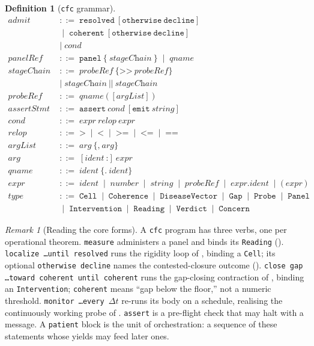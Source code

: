\documentclass[11pt,a4paper]{article}
\theoremstyle{cfcthm}
\theoremstyle{definition}
\newtheorem{definition}[theorem]{Definition}
\theoremstyle{remark}
\newtheorem{remark}[theorem]{Remark}
\newcommand{\bnf}{\;::=\;}
\newcommand{\alt}{\;\mid\;}
\newcommand{\cf}[1]{\texttt{#1}}
\begin{document}
\begin{definition}[\cf{cfc} grammar]
\begin{align*}
\textit{admit} &\bnf \cf{resolved}\ [\cf{otherwise}\ \cf{decline}]\\
  &\alt\cf{coherent}\ [\cf{otherwise}\ \cf{decline}]\\
  &\alt\textit{cond}\\[2pt]
\textit{panelRef} &\bnf \cf{panel}\ \cf{\{}\ \textit{stageChain}\ \cf{\}}\alt\textit{qname}\\
\textit{stageChain} &\bnf \textit{probeRef}\ \{\cf{>>}\ \textit{probeRef}\}\\
  &\alt\textit{stageChain}\ \cf{||}\ \textit{stageChain}\\
\textit{probeRef} &\bnf \textit{qname}\ \cf{(}\ [\textit{argList}]\ \cf{)}\\[2pt]
\textit{assertStmt} &\bnf \cf{assert}\ \textit{cond}\ [\cf{emit}\ \textit{string}]\\[2pt]
\textit{cond} &\bnf \textit{expr}\ \textit{relop}\ \textit{expr}\\
\textit{relop} &\bnf \cf{>}\alt\cf{<}\alt\cf{>=}\alt\cf{<=}\alt\cf{==}\\
\textit{argList} &\bnf \textit{arg}\ \{\cf{,}\ \textit{arg}\}\\
\textit{arg} &\bnf [\textit{ident}\ \cf{:}]\ \textit{expr}\\
\textit{qname} &\bnf \textit{ident}\ \{\cf{.}\ \textit{ident}\}\\
\textit{expr} &\bnf \textit{ident}\alt\textit{number}\alt\textit{string}
   \alt\textit{probeRef}\alt\textit{expr}\cf{.}\textit{ident}\alt\cf{(}\ \textit{expr}\ \cf{)}\\
\textit{type} &\bnf \cf{Cell}\alt\cf{Coherence}\alt\cf{DiseaseVector}\alt\cf{Gap}
   \alt\cf{Probe}\alt\cf{Panel}\\
  &\alt\cf{Intervention}\alt\cf{Reading}\alt\cf{Verdict}\alt\cf{Concern}
\end{align*}
\end{definition}

\begin{remark}[Reading the core forms]
\label{rem:core-forms}
A \cf{cfc} program has three verbs, one per operational theorem.
\cf{measure} administers a panel and binds its \cf{Reading}
(). \cf{localize \ldots until resolved} runs the rigidity loop
of , binding a \cf{Cell}; its optional
\cf{otherwise decline} names the contested-closure outcome
(). \cf{close gap \ldots toward coherent until coherent}
runs the gap-closing contraction of , binding an
\cf{Intervention}; \cf{coherent} means ``gap below the floor,'' not a numeric
threshold. \cf{monitor \ldots every $\Delta t$} re-runs its body on a schedule,
realising the continuously working probe of .
\cf{assert} is a pre-flight check that may halt with a message.
A \cf{patient} block is the unit of orchestration: a sequence of these
statements whose yields may feed later ones.
\end{remark}
\end{document}
